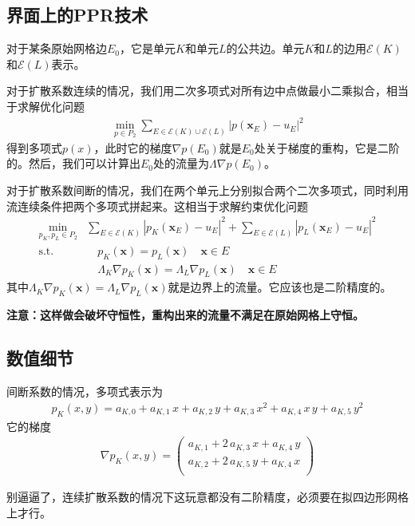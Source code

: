 \documentclass[12pt,a4paper]{article}
\theoremstyle{plain}
\begin{document}
\subsection*{界面上的PPR技术}

对于某条原始网格边$E_0$，它是单元$K$和单元$L$的公共边。单元$K$和$L$的边用$\mathcal{E}(K)$和$\mathcal{E}(L)$表示。

对于扩散系数连续的情况，我们用二次多项式对所有边中点做最小二乘拟合，相当于求解优化问题
\begin{align*}
\min_{p \in P_2} \sum_{E \in \mathcal{E}(K) \cup \mathcal{E}(L)} |p(\bm{x}_E) - u_E|^2
\end{align*}
得到多项式$p(x)$，此时它的梯度$\nabla p(E_0)$就是$E_0$处关于梯度的重构，它是二阶的。然后，我们可以计算出$E_0$处的流量为$\Lambda \nabla p(E_0)$。

对于扩散系数间断的情况，我们在两个单元上分别拟合两个二次多项式，同时利用流连续条件把两个多项式拼起来。这相当于求解约束优化问题
\begin{align*}
\min_{p_{K}, p_{L} \in P_2} & \sum_{E \in \mathcal{E}(K)} |p_{K}(\bm{x}_E) - u_E|^2 + \sum_{E \in \mathcal{E}(L)} |p_{L}(\bm{x}_E) - u_E|^2 \\
\text{s.t.} & \quad p_{K}(\bm{x}) = p_{L}(\bm{x}) \quad \bm{x} \in {E} \\
 & \quad \Lambda_{K} \nabla p_{K}(\bm{x}) = \Lambda_{L} \nabla p_{L}(\bm{x}) \quad \bm{x} \in {E}
\end{align*}
其中$\Lambda_{K} \nabla p_{K}(\bm{x}) = \Lambda_{L} \nabla p_{L}(\bm{x})$就是边界上的流量。它应该也是二阶精度的。

\textbf{注意：这样做会破坏守恒性，重构出来的流量不满足在原始网格上守恒。}

\subsection*{数值细节}

间断系数的情况，多项式表示为
\begin{align*}
p_{K}(x,y) = a_{K,0} + a_{K,1} \, x + a_{K,2} \, y + a_{K,3} \, x^2 + a_{K,4} \, x \, y + a_{K,5} \, y^2
\end{align*}
它的梯度
\begin{align*}
\nabla p_{K}(x,y) =
\left(
\begin{matrix}
a_{K,1} + 2 \, a_{K,3} \, x + a_{K,4} \, y \\
a_{K,2} + 2 \, a_{K,5} \, y + a_{K,4} \, x \\
\end{matrix}
\right)
\end{align*}

别逼逼了，连续扩散系数的情况下这玩意都没有二阶精度，必须要在拟四边形网格上才行。







%
%
\end{document}
